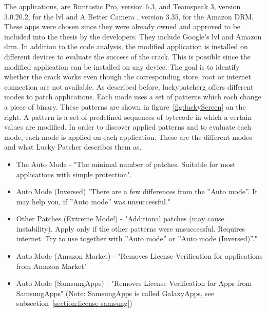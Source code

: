 The applications, are Runtastic Pro\cite{runtasticApp}, version 6.3, and Teamspeak 3\cite{teamspeakApp}, version 3.0.20.2, for the \gls{lvl} and A Better Camera \cite{abettercamera}, version 3.35, for the Amazon DRM.
These apps were chosen since they were already owned and approved to be included into the thesis by the developers.
They include Google’s \gls{lvl} and Amazon \gls{drm}.
\newline
In addition to the code analysis, the modified application is installed on different devices to evaluate the success of the crack.
This is possible since the modified application can be installed on any device.
The goal is to identify whether the crack works even though the corresponding store, root or internet connection are not available.
\newline
As described before, \gls{luckypatcherg} offers different modes to patch applications.
Each mode uses a set of patterns which each change a piece of binary.
These patterns are shown in figure~\ref{fig:luckyScreen} on the right.
A pattern is a set of predefined sequences of bytecode in which a certain values are modified.
In order to discover applied patterns and to evaluate each mode, each mode is applied on each application.
\newline
These are the different modes and what Lucky Patcher describes them as.
\begin{itemize}
\item The Auto Mode - "The minimal number of patches. Suitable for most applications with simple protection".
\item Auto Mode (Inversed) "There are a few differences from the ”Auto mode”. It may help you, if ”Auto mode” was unsuccessful."
\item Other Patches (Extreme Mode!) - "Additional patches (may cause instability). Apply only if the other patterns were unsuccessful. Requires internet. Try to use together with ”Auto mode” or ”Auto mode (Inversed)”."
\item Auto Mode (Amazon Market) - "Removes License Verification for applications from Amazon Market"
\item Auto Mode (SamsungApps) - "Removes License Verification for Apps from SamsungApps" (Note: SamsungApps is called GalaxyApps, see subsection~\ref{section:license-samsung})
\end{itemize}
